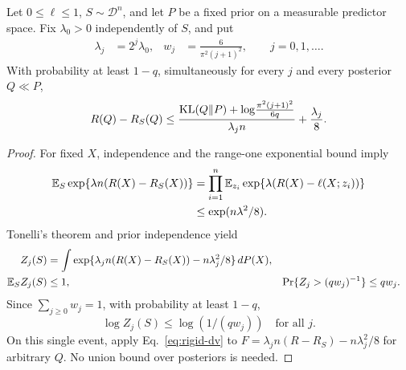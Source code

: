 \begin{theorem}
\label{thm:rigid-pacbayes}
Let $0\leq\ell\leq1$, $S\sim\mathcal D^n$, and let $P$ be a fixed prior
on a measurable predictor space. Fix $\lambda_0>0$ independently of $S$,
and put
\begin{align}
\lambda_j&=2^j\lambda_0,&
w_j&=\frac{6}{\pi^2(j+1)^2},\qquad j=0,1,\ldots .
\end{align}
With probability at least $1-q$, simultaneously for every $j$ and
every posterior $Q\ll P$,
\begin{equation}
R(Q)-R_S(Q)
\leq
\frac{{\rm KL}(Q\|P)+\log\!\frac{\pi^2(j+1)^2}{6q}}
{\lambda_j n}
+\frac{\lambda_j}{8}.
\label{eq:rigid-pacbayes}
\end{equation}
\end{theorem}
\begin{proof}
For fixed $X$, independence and the range-one exponential bound imply
\begin{align}
\mathbb E_S\exp\{\lambda n(R(X)-R_S(X))\}
&=\prod_{i=1}^n
\mathbb E_{z_i}\exp\{\lambda(R(X)-\ell(X;z_i))\}\\
&\leq\exp(n\lambda^2/8).
\end{align}
Tonelli's theorem and prior independence yield
\begin{align}
Z_j(S)&=\int
\exp\{\lambda_jn(R(X)-R_S(X))-n\lambda_j^2/8\}\,dP(X),\\
\mathbb E_S Z_j(S)&\leq1,&
\Pr\{Z_j>(qw_j)^{-1}\}&\leq qw_j .
\end{align}
Since $\sum_{j\geq0}w_j=1$, with probability at least $1-q$,
\begin{equation}
\log Z_j(S)\leq\log(1/(qw_j))
\quad\text{for all }j .
\end{equation}
On this single event, apply Eq.~\eqref{eq:rigid-dv} to
$F=\lambda_jn(R-R_S)-n\lambda_j^2/8$ for arbitrary $Q$.
No union bound over posteriors is needed.
\end{proof}

